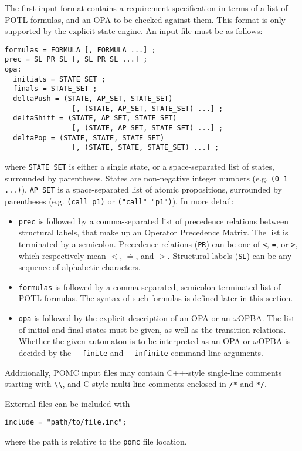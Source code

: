 \documentclass[9pt,a4paper]{article}
\begin{document}
The first input format contains a requirement specification in terms of a list of
POTL formulas, and an OPA to be checked against them.
This format is only supported by the explicit-state engine.
An input file must be as follows:
\begin{verbatim}
formulas = FORMULA [, FORMULA ...] ;
prec = SL PR SL [, SL PR SL ...] ;
opa:
  initials = STATE_SET ;
  finals = STATE_SET ;
  deltaPush = (STATE, AP_SET, STATE_SET)
                [, (STATE, AP_SET, STATE_SET) ...] ;
  deltaShift = (STATE, AP_SET, STATE_SET)
                [, (STATE, AP_SET, STATE_SET) ...] ;
  deltaPop = (STATE, STATE, STATE_SET)
                [, (STATE, STATE, STATE_SET) ...] ;
\end{verbatim}
where \texttt{STATE\_SET} is either a single state, or a space-separated list of states,
surrounded by parentheses.
States are non-negative integer numbers (e.g. \texttt{(0 1 ...)}).
\texttt{AP\_SET} is a space-separated list of atomic propositions, surrounded by parentheses
(e.g. \texttt{(call p1)} or \texttt{("call" "p1")}).
In more detail:
\begin{itemize}
\item \texttt{prec}
  is followed by a comma-separated list of precedence relations between structural labels,
  that make up an Operator Precedence Matrix.
  The list is terminated by a semicolon.
  Precedence relations (\texttt{PR}) can be one of \texttt{<}, \texttt{=}, or \texttt{>},
  which respectively mean $\lessdot$, $\doteq$, and $\gtrdot$.
  Structural labels (\texttt{SL}) can be any sequence of alphabetic characters.
\item \texttt{formulas}
  is followed by a comma-separated, semicolon-terminated list of POTL formulas.
  The syntax of such formulas is defined later in this section.
\item \texttt{opa}
  is followed by the explicit description of an OPA or an $\omega$OPBA.
  The list of initial and final states must be given, as well as the transition relations.
  Whether the given automaton is to be interpreted as an OPA or $\omega$OPBA is decided
  by the \verb|--finite| and \verb|--infinite| command-line arguments.
\end{itemize}

Additionally, POMC input files may contain C++-style single-line comments
starting with \verb|\\|, and C-style multi-line comments enclosed in
\verb|/*| and \verb|*/|.

External files can be included with
\begin{verbatim}
include = "path/to/file.inc";
\end{verbatim}
where the path is relative to the \texttt{pomc} file location.
\end{document}
